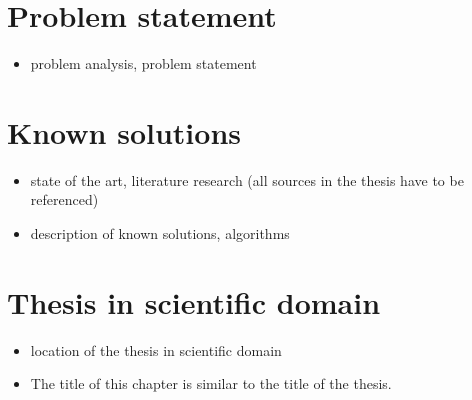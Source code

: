 \section{Problem statement}

\begin{itemize}
    \item problem analysis, problem statement
\end{itemize}
    

\section{Known solutions}

\begin{itemize}
    \item state of the art, literature research (all sources in the thesis have to be referenced)
    \item description of known solutions, algorithms
\end{itemize}


\section{Thesis in scientific domain}

\begin{itemize}
    \item location of the thesis in scientific domain
    \item The title of this chapter is similar to the title of the thesis.
\end{itemize}
